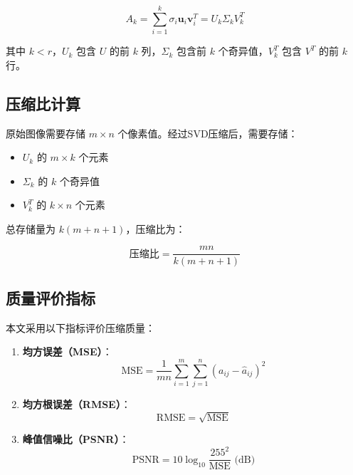 \documentclass[12pt,a4paper]{article}
\begin{document}
\begin{equation}
    A_k = \sum_{i=1}^{k} \sigma_i \mathbf{u}_i \mathbf{v}_i^T = U_k \Sigma_k V_k^T
\end{equation}

其中 $k < r$，$U_k$ 包含 $U$ 的前 $k$ 列，$\Sigma_k$ 包含前 $k$ 个奇异值，$V_k^T$ 包含 $V^T$ 的前 $k$ 行。

\subsection{压缩比计算}

原始图像需要存储 $m \times n$ 个像素值。经过SVD压缩后，需要存储：
\begin{itemize}
    \item $U_k$ 的 $m \times k$ 个元素
    \item $\Sigma_k$ 的 $k$ 个奇异值
    \item $V_k^T$ 的 $k \times n$ 个元素
\end{itemize}

总存储量为 $k(m + n + 1)$，压缩比为：

\begin{equation}
    \text{压缩比} = \frac{mn}{k(m+n+1)}
\end{equation}

\subsection{质量评价指标}

本文采用以下指标评价压缩质量：

\begin{enumerate}
    \item \textbf{均方误差（MSE）}：
    \begin{equation}
        \text{MSE} = \frac{1}{mn}\sum_{i=1}^{m}\sum_{j=1}^{n}(a_{ij} - \hat{a}_{ij})^2
    \end{equation}
    
    \item \textbf{均方根误差（RMSE）}：
    \begin{equation}
        \text{RMSE} = \sqrt{\text{MSE}}
    \end{equation}
    
    \item \textbf{峰值信噪比（PSNR）}：
    \begin{equation}
        \text{PSNR} = 10\log_{10}\frac{255^2}{\text{MSE}} \text{ (dB)}
    \end{equation}
\end{enumerate}
\end{document}
